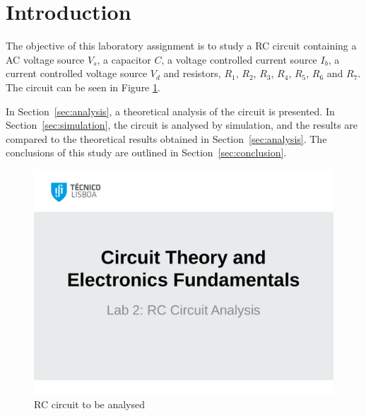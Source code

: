 \section{Introduction}
\label{sec:introduction}

The objective of this laboratory assignment is to study a RC circuit containing a
AC voltage source $V_s$, a capacitor $C$, a voltage controlled current
source $I_b$, a current controlled voltage source $V_d$ and resistors,
$R_1$, $R_2$, $R_3$, $R_4$, $R_5$, $R_6$ and $R_7$. The circuit can be seen in 
Figure \ref{fig:t2}.

In Section~\ref{sec:analysis}, a theoretical analysis of the circuit is
presented. In Section~\ref{sec:simulation}, the circuit is analysed by
simulation, and the results are compared to the theoretical results obtained in
Section~\ref{sec:analysis}. The conclusions of this study are outlined in
Section~\ref{sec:conclusion}.

\begin{figure}[H] \centering
\includegraphics[width=1\linewidth]{t2.pdf}
\caption{RC circuit to be analysed}
\label{fig:t2}
\end{figure}

